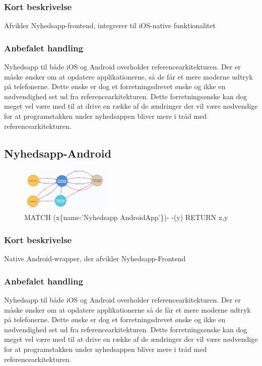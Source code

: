 \documentclass{article}
\begin{document}
\subsubsection*{Kort beskrivelse}
Afvikler Nyhedsapp-frontend, integrerer til iOS-native funktionalitet
\subsubsection*{Anbefalet handling}
Nyhedsapp til både iOS og Android overholder referencearkitekturen. Der er måske ønsker om at opdatere applikationerne, så de får et mere moderne udtryk på telefonerne. Dette ønske er dog et forretningsdrevet ønske og ikke en nødvendighed set ud fra referencearkitekturen. Dette forretningsønske kan dog meget vel være med til at drive en række af de ændringer der vil være nødvendige for at programstakken under nyhedsappen bliver mere i tråd med referencearkitekturen.


\subsection{Nyhedsapp-Android}
\begin{figure}[h]
\includegraphics[width=120pt]{Nyhedsapp-Android.PNG}
\caption{MATCH (x\{name:'Nyhedsapp AndroidApp'\})- -(y) RETURN x,y}
\end{figure}
\subsubsection*{Kort beskrivelse}
Native Android-wrapper, der afvikler Nyhedsapp-Frontend
\subsubsection*{Anbefalet handling}
Nyhedsapp til både iOS og Android overholder referencearkitekturen. Der er måske ønsker om at opdatere applikationerne så de får et mere moderne udtryk på telefonerne. Dette ønske er dog et forretningsdrevet ønske og ikke en nødvendighed set ud fra referencearkitekturen. Dette forretningsønske kan dog meget vel være med til at drive en række af de ændringer der vil være nødvendige for at programstakken under nyhedsappen bliver mere i tråd med referencearkitekturen.
\end{document}

